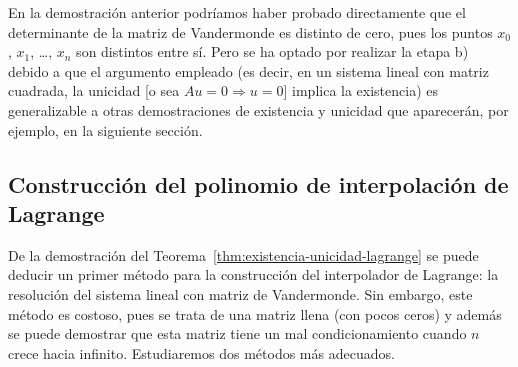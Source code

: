\begin{remark}
  \label{rk:1}
  En la demostración anterior podríamos haber probado directamente
  que el determinante de la matriz de Vandermonde es distinto de cero,
  pues los puntos $x_0$, $x_1$, \dots, $x_n$ son distintos
  entre sí. Pero se ha optado por realizar la etapa b) debido a que el
  argumento empleado (es decir, en un sistema lineal con matriz
  cuadrada, la unicidad [o sea $Au=0 \Rightarrow u=0$] implica la existencia)
  es generalizable a otras demostraciones de existencia y unicidad que
  aparecerán, por ejemplo, en la siguiente sección.
\end{remark}

\subsection{Construcción del polinomio de interpolación de Lagrange}
\label{sec:construcion--polinomio-lagrange}

De la demostración del Teorema~\ref{thm:existencia-unicidad-lagrange}
se puede deducir un primer método para la construcción del
interpolador de Lagrange: la resolución del sistema lineal con matriz
de Vandermonde. Sin embargo, este método es costoso, pues se trata de
una matriz llena (con pocos ceros) y además se puede demostrar que
esta matriz tiene un mal condicionamiento cuando $n$ crece hacia
infinito. Estudiaremos dos métodos más adecuados.

